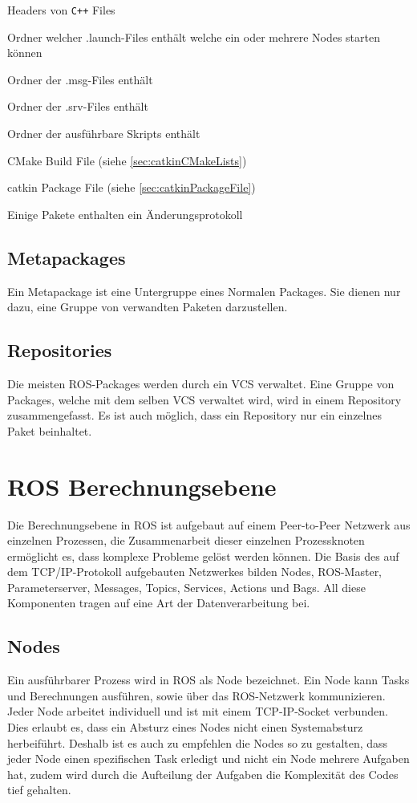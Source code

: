 \begin{description}[align=left]
	\item[include/package\_name] Headers von \verb|C++| Files
	\item[launch/] Ordner welcher .launch-Files enthält welche ein oder mehrere Nodes starten können
	\item[msg/] Ordner der .msg-Files enthält
	\item[srv/] Ordner der .srv-Files enthält
	\item[scripts/] Ordner der ausführbare Skripts enthält
	\item[CMakeLists.txt] CMake Build File (siehe \ref{sec:catkinCMakeLists})
	\item[Package.xml] catkin Package File (siehe \ref{sec:catkinPackageFile})
	\item[Changelog.rst] Einige Pakete enthalten ein Änderungsprotokoll
\end{description}

\subsection{Metapackages}
Ein Metapackage ist eine Untergruppe eines Normalen Packages. Sie dienen nur dazu, eine Gruppe von verwandten Paketen darzustellen. 

\subsection{Repositories}
Die meisten ROS-Packages werden durch ein \gls{VCS} verwaltet. Eine Gruppe von Packages, welche mit dem selben VCS verwaltet wird, wird in einem Repository zusammengefasst. Es ist auch möglich, dass ein Repository nur ein einzelnes Paket beinhaltet.


\section{ROS Berechnungsebene}
Die Berechnungsebene in ROS ist aufgebaut auf einem Peer-to-Peer Netzwerk aus einzelnen Prozessen, die Zusammenarbeit dieser einzelnen Prozessknoten ermöglicht es, dass komplexe Probleme gelöst werden können. Die Basis des auf dem TCP/IP-Protokoll aufgebauten Netzwerkes bilden Nodes, ROS-Master, Parameterserver, Messages, Topics, Services, Actions und Bags. All diese Komponenten tragen auf eine Art der Datenverarbeitung bei.

\subsection{Nodes}
Ein ausführbarer Prozess wird in ROS als Node bezeichnet. Ein Node kann Tasks und Berechnungen ausführen, sowie über das ROS-Netzwerk kommunizieren. Jeder Node arbeitet  individuell und ist mit einem TCP-IP-Socket verbunden. Dies erlaubt es, dass ein Absturz eines Nodes nicht einen Systemabsturz herbeiführt. Deshalb ist es auch zu empfehlen die Nodes so zu gestalten, dass jeder Node einen spezifischen Task erledigt und nicht ein Node mehrere Aufgaben hat, zudem wird durch die Aufteilung der Aufgaben die Komplexität des Codes tief gehalten.\cite{Conley2013}


